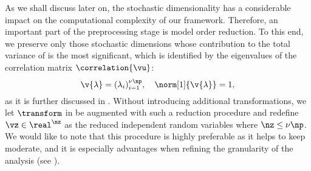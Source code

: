 As we shall discuss later on, the stochastic dimensionality \nz has a
considerable impact on the computational complexity of our framework. Therefore,
an important part of the preprocessing stage is model order reduction. To this
end, we preserve only those stochastic dimensions whose contribution to the
total variance of \vu is the most significant, which is identified by the
eigenvalues of the correlation matrix $\correlation{\vu}$:
\[
  \v{\lambda} = (\lambda_i)_{i = 1}^{\nu \np}, \hspace{1em}
  \norm[1]{\v{\lambda}} = 1,
\]
as it is further discussed in . Without introducing
additional transformations, we let $\transform$ in
 be augmented with such a reduction procedure
and redefine $\vz \in \real^\nz$ as the reduced independent random variables
where $\nz \leq \nu \np$. We would like to note that this procedure is highly
preferable as it helps to keep \nz moderate, and it is especially advantages
when refining the granularity of the analysis (see ).

